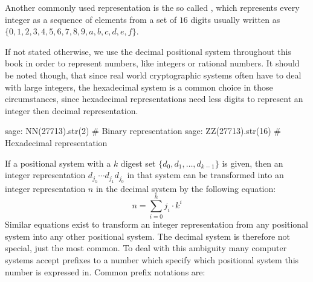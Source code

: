 Another commonly used representation is the so called , which represents every integer as a sequence of elements from a set of $16$ digits usually written as $\{0,1,2,3,4,5,6,7,8,9,a,b,c,d,e,f\}$. 

If not stated otherwise, we use the decimal positional system throughout this book in order to represent numbers, like integers or rational numbers. It should be noted though, that since real world cryptographic systems often have to deal with large integers, the hexadecimal system is a common choice in those circumstances, since hexadecimal representations need less digits to represent an integer then decimal representation.  
\begin{sagecommandline}
sage: NN(27713).str(2) # Binary representation
sage: ZZ(27713).str(16) # Hexadecimal representation
\end{sagecommandline}
If a positional system with a $k$ digest set $\{d_0,d_1,\ldots, d_{k-1}\}$ is given, then an integer representation $d_{j_h}\cdots d_{j_1} d_{j_0}$ in that system can be transformed into 
an integer representation $n$ in the decimal system by the following equation:
\begin{equation}
\label{eq:from-k-digits-to-deci}
n = \sum_{i=0}^h j_i\cdot k^{i}
\end{equation}
Similar equations exist to transform an integer representation from any positional system into any other positional system. The decimal system is therefore not special, just the most common. To deal with this ambiguity many computer systems accept prefixes to a number which specify which positional system this number is expressed in. Common prefix notations are:
 
